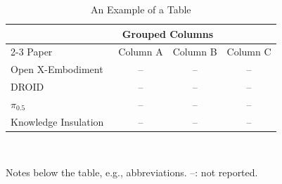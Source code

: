 \begin{table}[t]
  \centering
  \caption{An Example of a Table}
  \label{tab:example}
  \footnotesize
  \begin{tabular}{@{}lccc@{}}
    \toprule
     & \multicolumn{2}{c}{Grouped Columns} & \\
    \cmidrule(lr){2-3}
    Paper & Column A & Column B & Column C \\
    \midrule
    Open X-Embodiment~\cite{oxe2023} & -- & -- & -- \\
    DROID~\cite{khazatsky2024droid} & -- & -- & -- \\
    $\pi_{0.5}$~\cite{pi2025pi05} & -- & -- & -- \\
    Knowledge Insulation~\cite{driess2025ki} & -- & -- & -- \\
    \bottomrule
  \end{tabular}
  \\[2pt]\raggedright\scriptsize Notes below the table, e.g., abbreviations. --: not reported.
\end{table}
